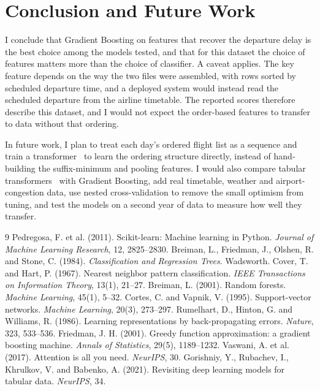 \documentclass[12pt,a4paper]{article}
\begin{document}
\section{Conclusion and Future Work}\label{sec:conclusion}
I conclude that Gradient Boosting on features that recover the departure delay is the best choice among the models tested, and that for this dataset the choice of features matters more than the choice of classifier. A caveat applies. The key feature depends on the way the two files were assembled, with rows sorted by scheduled departure time, and a deployed system would instead read the scheduled departure from the airline timetable. The reported scores therefore describe this dataset, and I would not expect the order-based features to transfer to data without that ordering.

In future work, I plan to treat each day's ordered flight list as a sequence and train a transformer~\cite{attention} to learn the ordering structure directly, instead of hand-building the suffix-minimum and pooling features. I would also compare tabular transformers~\cite{fttransformer} with Gradient Boosting, add real timetable, weather and airport-congestion data, use nested cross-validation to remove the small optimism from tuning, and test the models on a second year of data to measure how well they transfer.

\begin{thebibliography}{9}\footnotesize\setlength{\itemsep}{0pt}
 Pedregosa, F. et al. (2011). Scikit-learn: Machine learning in Python. \emph{Journal of Machine Learning Research}, 12, 2825--2830.
 Breiman, L., Friedman, J., Olshen, R. and Stone, C. (1984). \emph{Classification and Regression Trees}. Wadsworth.
 Cover, T. and Hart, P. (1967). Nearest neighbor pattern classification. \emph{IEEE Transactions on Information Theory}, 13(1), 21--27.
 Breiman, L. (2001). Random forests. \emph{Machine Learning}, 45(1), 5--32.
 Cortes, C. and Vapnik, V. (1995). Support-vector networks. \emph{Machine Learning}, 20(3), 273--297.
 Rumelhart, D., Hinton, G. and Williams, R. (1986). Learning representations by back-propagating errors. \emph{Nature}, 323, 533--536.
 Friedman, J. H. (2001). Greedy function approximation: a gradient boosting machine. \emph{Annals of Statistics}, 29(5), 1189--1232.
 Vaswani, A. et al. (2017). Attention is all you need. \emph{NeurIPS}, 30.
 Gorishniy, Y., Rubachev, I., Khrulkov, V. and Babenko, A. (2021). Revisiting deep learning models for tabular data. \emph{NeurIPS}, 34.
\end{thebibliography}
\end{document}
